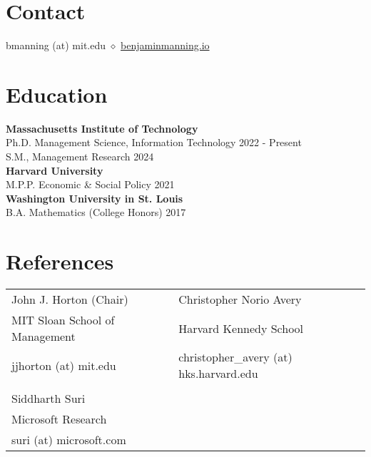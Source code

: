 \documentclass[margin,line,pifont,palatino,courier, 9pt]{res}
\begin{document}
\begin{resume}


\normalsize


\section{\sc Contact}
bmanning (at) mit.edu $\diamond$ \href{https://benjaminmanning.io/}{benjaminmanning.io}

\section{\sc Education}
{\bf Massachusetts Institute of Technology}\\
Ph.D. Management Science, Information Technology \hfill 2022 - Present\\
S.M., Management Research \hfill 2024\vspace{2mm}\\
{\bf Harvard University}\\
M.P.P. Economic \& Social Policy \hfill 2021\vspace{2mm}\\
{\bf Washington University in St. Louis}\\
B.A. Mathematics (College Honors) \hfill 2017

\section{\sc References}
\vspace{.15cm}
\begin{tabular}{@{}p{2.6in}p{2.75in}}
John J. Horton (Chair)& Christopher Norio Avery\\
MIT Sloan School of Management & Harvard Kennedy School \\
jjhorton (at) mit.edu & christopher\_avery (at) hks.harvard.edu\\\\
Siddharth Suri & \\
Microsoft Research & \\
suri (at) microsoft.com & \\
\end{tabular}


\end{resume}
\end{document}
